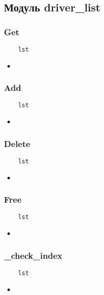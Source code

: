 \subsection{Модуль driver\_list}

\subsubsection{Get}

\begin{lstlisting}
    lst
\end{lstlisting}

\begin{itemize}
    \item \verb||
\end{itemize}

\subsubsection{Add}

\begin{lstlisting}
    lst
\end{lstlisting}

\begin{itemize}
    \item \verb||
\end{itemize}

\subsubsection{Delete}

\begin{lstlisting}
    lst
\end{lstlisting}

\begin{itemize}
    \item \verb||
\end{itemize}

\subsubsection{Free}

\begin{lstlisting}
    lst
\end{lstlisting}

\begin{itemize}
    \item \verb||
\end{itemize}

\subsubsection{\_check\_index}

\begin{lstlisting}
    lst
\end{lstlisting}

\begin{itemize}
    \item \verb||
\end{itemize}

